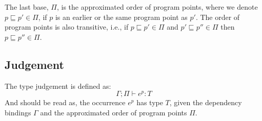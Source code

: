 \documentclass[../../master.tex]{subfiles}
\begin{document}
The last base, $\Pi$, is the approximated order of program points, where we denote $p\sqsubseteq p'\in\Pi$, if $p$ is an earlier or the same program point as $p'$.
The order of program points is also transitive, i.e., if $p\sqsubseteq p'\in\Pi$ and $p'\sqsubseteq p''\in\Pi$ then $p\sqsubseteq p''\in\Pi$.


\subsection{Judgement}
The type judgement is defined as:
$$\Gamma;\Pi\vdash e^p: T$$
And should be read as, the occurrence $e^p$ has type $T$, given the dependency bindings $\Gamma$ and the approximated order of program points $\Pi$.

\begin{landscape}

\end{landscape}
\end{document}
